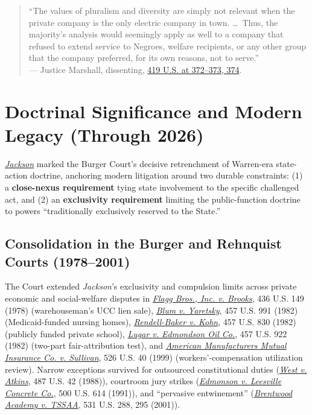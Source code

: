\documentclass[12pt]{article}
\begin{document}
\begin{quote}
``The values of pluralism and diversity are simply not relevant when the private company is the only electric company in town. \dots\ Thus, the majority's analysis would seemingly apply as well to a company that refused to extend service to Negroes, welfare recipients, or any other group that the company preferred, for its own reasons, not to serve.'' \\
--- Justice Marshall, dissenting, \href{https://supreme.justia.com/cases/federal/us/419/345/}{419 U.S. at 372--373, 374}.
\end{quote}

\section{Doctrinal Significance and Modern Legacy (Through 2026)}

\href{https://supreme.justia.com/cases/federal/us/419/345/}{\emph{Jackson}} marked the Burger Court's decisive retrenchment of Warren-era state-action doctrine, anchoring modern litigation around two durable constraints: (1) a \textbf{close-nexus requirement} tying state involvement to the specific challenged act, and (2) an \textbf{exclusivity requirement} limiting the public-function doctrine to powers ``traditionally exclusively reserved to the State.''

\subsection{Consolidation in the Burger and Rehnquist Courts (1978--2001)}
The Court extended \emph{Jackson}'s exclusivity and compulsion limits across private economic and social-welfare disputes in \href{https://supreme.justia.com/cases/federal/us/436/149/}{\emph{Flagg Bros., Inc. v. Brooks}}, 436 U.S. 149 (1978) (warehouseman's UCC lien sale), \href{https://supreme.justia.com/cases/federal/us/457/991/}{\emph{Blum v. Yaretsky}}, 457 U.S. 991 (1982) (Medicaid-funded nursing homes), \href{https://supreme.justia.com/cases/federal/us/457/830/}{\emph{Rendell-Baker v. Kohn}}, 457 U.S. 830 (1982) (publicly funded private school), \href{https://www.law.cornell.edu/supremecourt/text/457/922}{\emph{Lugar v. Edmondson Oil Co.}}, 457 U.S. 922 (1982) (two-part fair-attribution test), and \href{https://www.law.cornell.edu/supremecourt/text/526/40}{\emph{American Manufacturers Mutual Insurance Co. v. Sullivan}}, 526 U.S. 40 (1999) (workers'-compensation utilization review). Narrow exceptions survived for outsourced constitutional duties (\href{https://supreme.justia.com/cases/federal/us/487/42/}{\emph{West v. Atkins}}, 487 U.S. 42 (1988)), courtroom jury strikes (\href{https://supreme.justia.com/cases/federal/us/500/614/}{\emph{Edmonson v. Leesville Concrete Co.}}, 500 U.S. 614 (1991)), and ``pervasive entwinement'' (\href{https://www.law.cornell.edu/supremecourt/text/531/288}{\emph{Brentwood Academy v. TSSAA}}, 531 U.S. 288, 295 (2001)).
\end{document}
